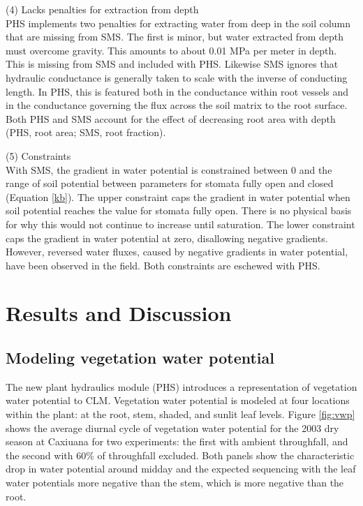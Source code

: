 \documentclass[draft,linenumbers]{agujournal}
\begin{document}
    (4) Lacks penalties for extraction from depth \\
    PHS implements two penalties for extracting water from deep in the soil column that are missing from SMS.
    The first is minor, but water extracted from depth must overcome gravity. 
    This amounts to about 0.01 MPa per meter in depth. 
    This is missing from SMS and included with PHS. 
    Likewise SMS ignores that hydraulic conductance is generally taken to scale with the inverse of conducting length.
    In PHS, this is featured both in the conductance within root vessels and 
    in the conductance governing the flux across the soil matrix to the root surface.
    Both PHS and SMS account for the effect of decreasing root area with depth (PHS, root area; SMS, root fraction).
    
    (5) Constraints \\
    With SMS, the gradient in water potential is constrained between 0 and 
    the range of soil potential between parameters for stomata fully open and closed (Equation \ref{kb}). 
    The upper constraint caps the gradient in water potential when soil potential reaches the value for stomata fully open.
    There is no physical basis for why this would not continue to increase until saturation.
    The lower constraint caps the gradient in water potential at zero, disallowing negative gradients.
    However, reversed water fluxes, caused by negative gradients in water potential, have been observed in the field.
    Both constraints are eschewed with PHS.     
    
\section{Results and Discussion}
\subsection{Modeling vegetation water potential}

The new plant hydraulics module (PHS) introduces a representation of vegetation water potential to CLM.
Vegetation water potential is modeled at four locations within the plant: at the root, stem, shaded, and sunlit leaf levels.
Figure \ref{fig:vwp} shows the average diurnal cycle of vegetation water potential for the 2003 dry season at Caxiuana for two experiments:
the first with ambient throughfall, and the second with 60\% of throughfall excluded. 
Both panels show the characteristic drop in water potential around midday and the expected sequencing with 
the leaf water potentials more negative than the stem, which is more negative than the root.
\end{document}
